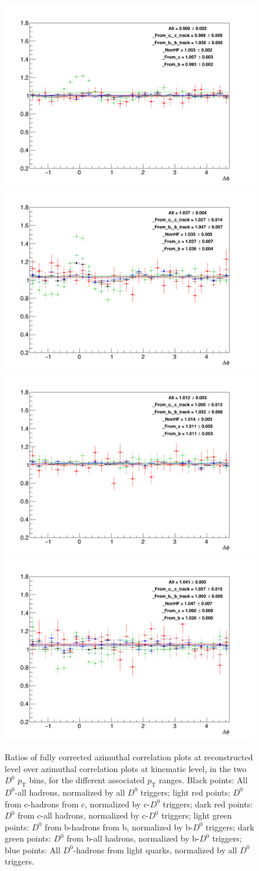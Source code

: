 \begin{figure}
\centering
{\includegraphics[width=.48\linewidth]{figures/MC_closure/MCClosure_Dzero_Canvas_PtIntBins4to5_PoolInt_thr03to1.png}}
{\includegraphics[width=.48\linewidth]{figures/MC_closure/MCClosure_Dzero_Canvas_PtIntBins4to5_PoolInt_thr1to99.png}} \\
{\includegraphics[width=.48\linewidth]{figures/MC_closure/MCClosure_Dzero_Canvas_PtIntBins9to10_PoolInt_thr03to1.png}}
{\includegraphics[width=.48\linewidth]{figures/MC_closure/MCClosure_Dzero_Canvas_PtIntBins9to10_PoolInt_thr1to99.png}}
\caption{Ratios of fully corrected azimuthal correlation plots at reconstructed level over azimuthal correlation plots at kinematic level, in the two $D^0$ $p_\text{T}$ bins, for the different associated $p_\text{T}$ ranges. Black points: All $D^0$-all hadrons, normalized by all $D^0$ triggers; light red points: $D^0$ from c-hadrons from c, normalized by c-$D^0$ triggers; dark red points: $D^0$ from c-all hadrons, normalized by c-$D^0$ triggers; light green points: $D^0$ from b-hadrons from b, normalized by b-$D^0$ triggers; dark green points: $D^0$ from b-all hadrons, normalized by b-$D^0$ triggers; blue points: All $D^0$-hadrons from light quarks, normalized by all $D^0$ triggers.
}
\end{figure}

